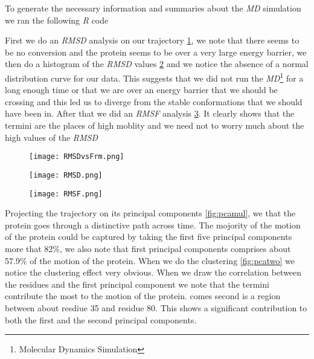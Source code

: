 \documentclass{article}
\begin{document}
 To generate the necessary information and summaries about the \emph{MD} simulation we ran the following \emph{R} code
 


First we do an \emph{RMSD} analysis on our trajectory \cref{fig:rmsdfrm}, we note that there seems to be no conversion and the protein seems to be over a very large energy barrier, we then do a histogram of the \emph{RMSD} values \cref{fig:rmsdhist} and we notice the absence of a normal distribution curve for our data. This suggests that we did not run the \emph{MD}\footnote{Molecular Dynamics Simulation} for a long enough time or that we are over an energy barrier that we should be crossing and this led us to diverge from the stable conformations that we should have been in. After that we did an \emph{RMSF} analysis \cref{fig:rmsf}. It clearly shows that the termini are the places of high moblity and we need not to worry much about the high values of the \emph{RMSD}

\begin{figure}[H]
          \centering
          \texttt{[image: RMSDvsFrm.png]}
          \label{fig:rmsdfrm}
\end{figure}


  \begin{figure}[H]
          \centering
          \texttt{[image: RMSD.png]}
          \label{fig:rmsdhist}
\end{figure}



\begin{figure}[H]
          \centering
          \texttt{[image: RMSF.png]}
          \label{fig:rmsf}
\end{figure}


Projecting the trajectory on its principal components \cref{fig:pcamul}, we that the protein goes through a distinctive path across time. The mojority of the motion of the protein could be captured by taking the first five principal components more that 82\%, we also note that first principal components comprises about 57.9\% of the motion of the protein. When we do the clustering \cref{fig:pcatwo} we notice the clustering effect very obvious. When we draw the correlation between the residues and the first principal component we note that the termini contribute the most to the motion of the protein. comes second is a region between about resdiue 35 and residue 80. This shows a significant contribution to both the first and the second principal components.
\end{document}
